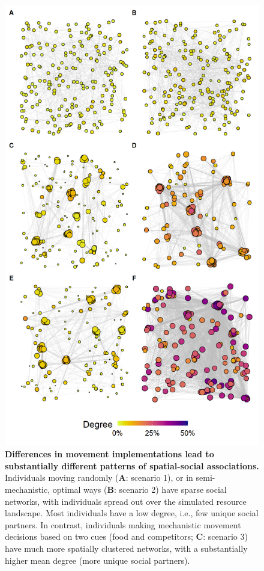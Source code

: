 \begin{figure}[p]
    \centering
    \includegraphics[width=0.9\linewidth]{figures/introduction/fig_cs_2_networks.png}
    \caption{
        \textbf{Differences in movement implementations lead to substantially different patterns of spatial-social associations.}
        Individuals moving randomly (\textbf{A}: scenario 1), or in semi-mechanistic, optimal ways (\textbf{B}: scenario 2) have sparse social networks, with individuals spread out over the simulated resource landscape.
        Most individuals have a low degree, i.e., few unique social partners.
        In contrast, individuals making mechanistic movement decisions based on two cues (food and competitors; \textbf{C}: scenario 3) have much more spatially clustered networks, with a substantially higher mean degree (more unique social partners).
}
\end{figure}
